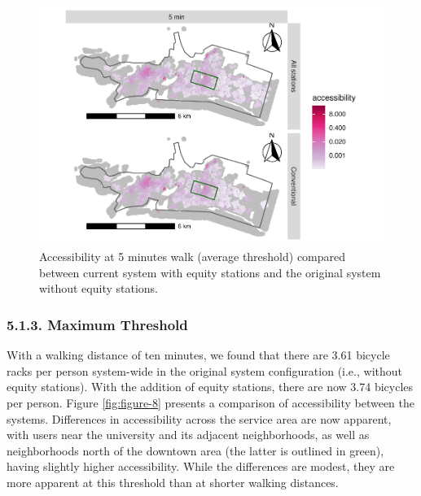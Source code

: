 \documentclass[]{elsarticle} %
\begin{document}
\begin{figure}

{\centering \includegraphics[width=0.9\linewidth]{Bike-share-spatial-equity_files/figure-latex/figure-7-1} 

}

\caption{Accessibility at 5 minutes walk (average threshold) compared between current system with equity stations and the original system without equity stations.}\label{fig:figure-7}
\end{figure}

\hypertarget{maximum-threshold}{%
\subsubsection{5.1.3. Maximum Threshold}\label{maximum-threshold}}

With a walking distance of ten minutes, we found that there are 3.61
bicycle racks per person system-wide in the original system
configuration (i.e., without equity stations). With the addition of
equity stations, there are now 3.74 bicycles per person. Figure
\ref{fig:figure-8} presents a comparison of accessibility between the
systems. Differences in accessibility across the service area are now
apparent, with users near the university and its adjacent neighborhoods,
as well as neighborhoods north of the downtown area (the latter is
outlined in green), having slightly higher accessibility. While the
differences are modest, they are more apparent at this threshold than at
shorter walking distances.
\end{document}
